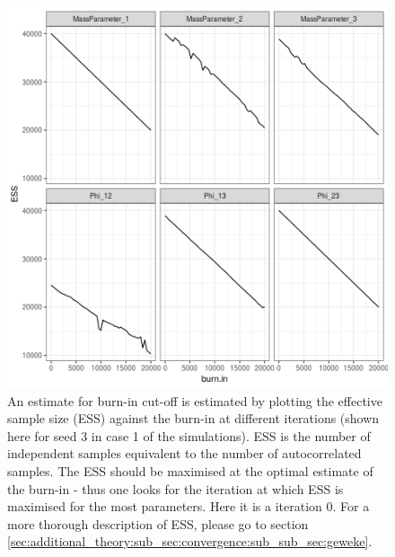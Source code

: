 \documentclass[12pt]{article} %
\begin{document}
	\begin{figure}[!htb]
	\centering
	\includegraphics[scale=0.65]{Images/Gen_data/Case_1/Esimated_burn_in_plot_3.png}
	\caption{An estimate for burn-in cut-off is estimated by plotting the effective sample size (ESS) against the burn-in at different iterations (shown here for seed 3 in case 1 of the simulations). ESS is the number of independent samples equivalent to the number of autocorrelated samples. The ESS should be maximised at the optimal estimate of the burn-in - thus one looks for the iteration at which ESS is maximised for the most parameters. Here it is a iteration 0. For a more thorough description of ESS, please go to section \ref{sec:additional_theory:sub_sec:convergence:sub_sub_sec:geweke}.}
	\label{fig:gen_data_case_1_estimated_burn_in_plot_3}
\end{figure}
\end{document}
